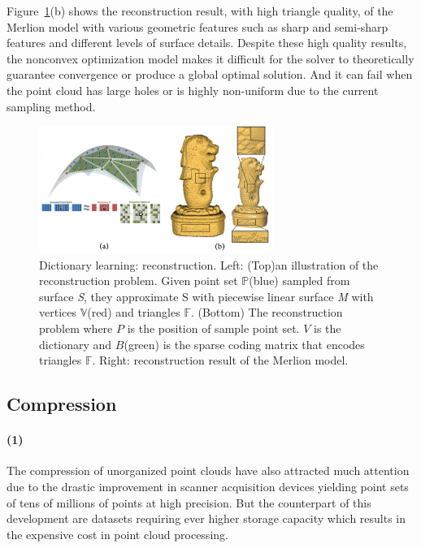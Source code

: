 Figure~\ref{fig:reconstructionlearning}(b) shows the reconstruction result, with high triangle quality, of the Merlion model with various geometric features such as sharp and semi-sharp features and different levels of surface details. Despite these high quality results, the nonconvex optimization model makes it difficult for the solver to theoretically guarantee convergence or produce a global optimal solution. And it can fail when the point cloud has large holes or is highly non-uniform due to the current sampling method.

\begin{figure}[ht]
  \centering
  \includegraphics[width=3.0in]{images/reconstruction_learning}
  \caption{Dictionary learning: reconstruction\cite{xiong2014robust}. Left: (Top)an illustration of the reconstruction problem. Given point set $\mathbb{P}$(blue) sampled from surface \textsl{S}, they approximate S with piecewise linear surface \textsl{M} with vertices $\mathbb{V}$(red) and triangles $\mathbb{F}$. (Bottom) The reconstruction problem where $P$ is the position of sample point set. $V$ is the dictionary and $B$(green) is the sparse coding matrix that encodes triangles $\mathbb{F}$. Right: reconstruction result of the Merlion model.}
  \label{fig:reconstructionlearning}
\end{figure}


\subsection{Compression}
\label{subsec:compression}

\paragraph{(1)}The compression of unorganized point clouds have also attracted much attention due to the drastic improvement in scanner acquisition devices yielding point sets of tens of millions of points at high precision. But the counterpart of this development are datasets requiring ever higher storage capacity which results in the expensive cost in point cloud processing.

